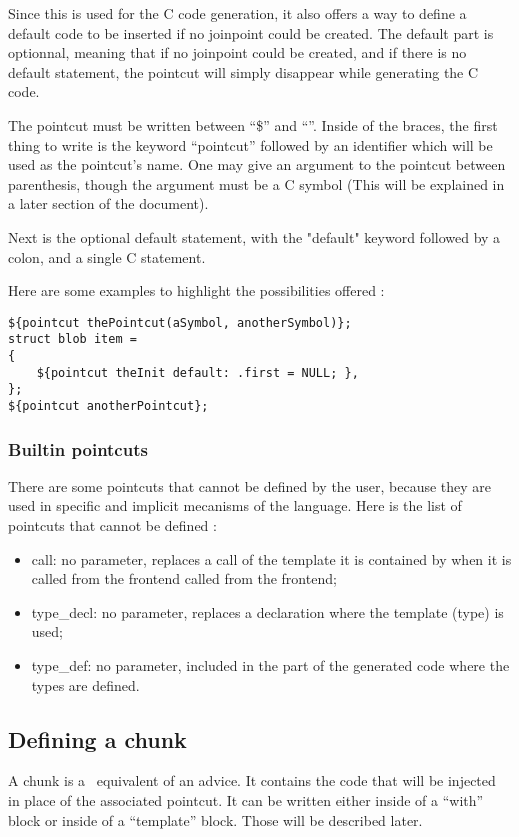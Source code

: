 \documentclass[american]{rtxreport}
\begin{document}
Since this is used for the C code generation, it also offers a way to define a
default code to be inserted if no joinpoint could be created. The default part
is optionnal, meaning that if no joinpoint could be created, and if there is no
default statement, the pointcut will simply disappear while generating the C
code.

The pointcut must be written between ``\${'' and ``}''.  Inside of the braces,
the first thing to write is the keyword ``pointcut'' followed by an identifier
which will be used as the pointcut's name. One may give an argument to the
pointcut between parenthesis, though the argument must be a C symbol (This will
be explained in a later section of the document).

Next is the optional default statement, with the "default" keyword followed by
a colon, and a single C statement.

Here are some examples to highlight the possibilities offered :
\begin{lstlisting}
${pointcut thePointcut(aSymbol, anotherSymbol)};
struct blob item =
{
    ${pointcut theInit default: .first = NULL; },
};
${pointcut anotherPointcut};
\end{lstlisting}

\subsubsection{Builtin pointcuts}

There are some pointcuts that cannot be defined by the user, because they are
used in specific and implicit mecanisms of the language. Here is the list of
pointcuts that cannot be defined :
\begin{itemize}
    \item call: no parameter, replaces a call of the template it is contained
        by when it is called from the frontend called from the frontend;
    \item type\_decl: no parameter, replaces a declaration where the template
        (type) is used;
    \item type\_def: no parameter, included in the part of the generated code
        where the types are defined.
\end{itemize}


\subsection{Defining a chunk}

A chunk is a \rtx\ equivalent of an advice. It contains the code that will be
injected in place of the associated pointcut. It can be written either inside
of a ``with'' block or inside of a ``template'' block. Those will be described
later.
\end{document}
